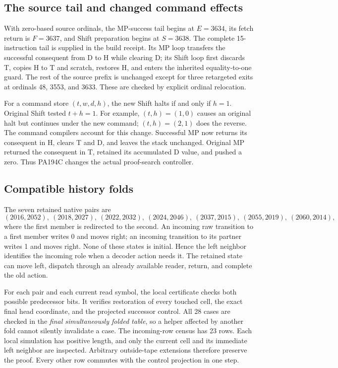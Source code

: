 \documentclass[11pt]{article}
\theoremstyle{definition}
\theoremstyle{remark}
\begin{document}
\subsection{The source tail and changed command effects}

With zero-based source ordinals, the MP-success tail begins at $E=3634$,
its fetch return is $F=3637$, and Shift preparation begins at $S=3638$.
The complete 15-instruction tail is supplied in the build receipt. Its MP
loop transfers the successful consequent from D to H while clearing D;
its Shift loop first discards T, copies H to T and scratch, restores H,
and enters the inherited equality-to-one guard. The rest of the source
prefix is unchanged except for three retargeted exits at ordinals 48,
3553, and 3633. These are checked by explicit ordinal relocation.

For a command store $(t,w,d,h)$, the new Shift halts if and only if $h=1$.
Original Shift tested $t+h=1$. For example, $(t,h)=(1,0)$ causes an original
halt but continues under the new command; $(t,h)=(2,1)$ does the reverse.
The command compilers account for this change. Successful MP now returns
its consequent in H, clears T and D, and leaves the stack unchanged.
Original MP returned the consequent in T, retained its accumulated D value,
and pushed a zero. Thus PA194C changes the actual proof-search controller.

\subsection{Compatible history folds}

The seven retained native pairs are
\[
 (2016,2052),\ (2018,2027),\ (2022,2032),\ (2024,2046),\
 (2037,2015),\ (2055,2019),\ (2060,2014),
\]
where the first member is redirected to the second. An incoming raw
transition to a first member writes 0 and moves right; an incoming
transition to its partner writes 1 and moves right. None of these states
is initial. Hence the left neighbor identifies the incoming role when
a decoder action needs it. The retained state can move left, dispatch
through an already available reader, return, and complete the old action.

For each pair and each current read symbol, the local certificate checks
both possible predecessor bits. It verifies restoration of every touched
cell, the exact final head coordinate, and the projected successor control.
All 28 cases are checked in the \emph{final simultaneously folded table},
so a helper affected by another fold cannot silently invalidate a case.
The incoming-row census has 23 rows. Each local simulation has positive
length, and only the current cell and its immediate left neighbor are
inspected. Arbitrary outside-tape extensions therefore preserve the proof.
Every other row commutes with the control projection in one step.
\end{document}
